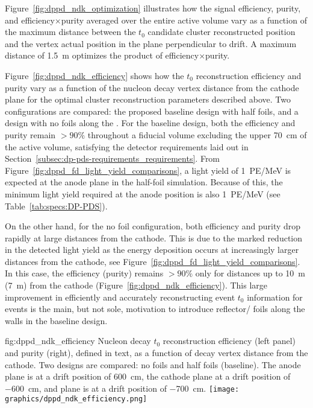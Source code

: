Figure~\ref{fig:dppd_ndk_optimization} illustrates how the  signal efficiency, purity, and efficiency$\times$purity averaged over the entire  active volume vary as a function of the maximum \twod distance between the $t_0$ candidate cluster reconstructed position and the  vertex actual position in the plane perpendicular to drift. A maximum distance of \SI{1.5}{\m} optimizes the product of efficiency$\times$purity. 

Figure~\ref{fig:dppd_ndk_efficiency} shows how the  $t_0$ reconstruction efficiency and purity vary as a function of the nucleon decay vertex distance from the cathode plane for the optimal cluster reconstruction parameters described above. Two configurations are compared: the proposed baseline design with half foils, and a design with no foils along the . For the baseline design, both the efficiency and purity remain $>90\%$ throughout a  fiducial volume excluding the upper \SI{70}{cm} of the  active volume, satisfying the detector requirements laid out in Section~\ref{subsec:dp-pds-requirements_requirements}. From Figure~\ref{fig:dppd_fd_light_yield_comparisons}, a light yield of \SI{1}{PE/\MeV} is expected at the anode plane in the half-foil simulation. Because of this, the  minimum light yield required at the anode position is also \SI{1}{PE/\MeV} (see Table~\ref{tab:specs:DP-PDS}). 

On the other hand, for the no foil configuration, both efficiency and purity drop rapidly at large distances from the cathode. This is due to the marked reduction in the detected  light yield as the energy deposition occurs at increasingly larger distances from the cathode, see Figure~\ref{fig:dppd_fd_light_yield_comparisons}. In this case, the efficiency (purity) remains $>90\%$ only for distances up to \SI{10}{\m} (\SI{7}{\m}) from the cathode (Figure~\ref{fig:dppd_ndk_efficiency}). This large improvement in efficiently and accurately reconstructing event $t_0$ information for  events is the main, but not sole, motivation to introduce reflector/ foils along the  walls in the baseline design.

\begin{dunefigure}{fig:dppd_ndk_efficiency}
     {Nucleon decay $t_0$ reconstruction efficiency (left panel) and purity (right), defined in text, as a function of decay vertex distance from the cathode. Two  designs are compared: no foils and half foils (baseline). The anode plane is at a drift position of \SI{+600}{\cm}, the cathode plane at a drift position of \SI{-600}{\cm},  and  plane is at a drift position of \SI{-700}{\cm}.}
    \texttt{[image: graphics/dppd\_ndk\_efficiency.png]}
    \end{dunefigure}

